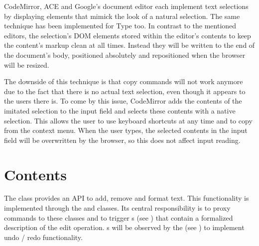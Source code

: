 CodeMirror, ACE and Google's document editor each implement text selections by displaying  elements that mimick the look of a natural selection. The same technique has been implemented for Type too. In contrast to the mentioned editors, the selection's DOM elements stored within the editor's contents to keep the content's markup clean at all times. Instead they will be written to the end of the document's body, positioned absolutely and repositioned when the browser will be resized.

The downside of this technique is that copy commands will not work anymore due to the fact that there is no actual text selection, even though it appears to the users there is. To come by this issue, CodeMirror adds the contents of the imitated selection to the input field and selects these contents with a native selection. This allows the user to use keyboard shortcuts at any time and to copy from the context menu. When the user types, the selected contents in the input field will be overwritten by the browser, so this does not affect input reading.





\section{Contents}

The  class provides an API to add, remove and format text. This functionality is implemented through the  and  classes. Its central responsibility is to proxy commands to these classes and to trigger s (see ) that contain a formalized description of the edit operation. s will be observed by the  (see ) to implement undo / redo functionality.



